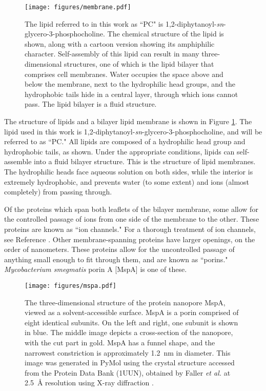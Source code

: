 \begin{figure}[h]
\begin{centering}
\texttt{[image: figures/membrane.pdf]}
\caption[Lipids and the lipid bilayer membrane]{The lipid referred to in this work as ``PC" is 1,2-diphytanoyl-\textit{sn}-glycero-3-phosphocholine.  The chemical structure of the lipid is shown, along with a cartoon version showing its amphiphilic character.  Self-assembly of this lipid can result in many three-dimensional structures, one of which is the lipid bilayer that comprises cell membranes.  Water occupies the space above and below the membrane, next to the hydrophilic head groups, and the hydrophobic tails hide in a central layer, through which ions cannot pass.  The lipid bilayer is a fluid structure.}
\label{fig:lipids}
\end{centering}
\end{figure}

The structure of lipids and a bilayer lipid membrane is shown in Figure \ref{fig:lipids}.  The lipid used in this work is 1,2-diphytanoyl-\textit{sn}-glycero-3-phosphocholine, and will be referred to as ``PC."  All lipids are composed of a hydrophilic head group and hydrophobic tails, as shown.  Under the appropriate conditions, lipids can self-assemble into a fluid bilayer structure.  This is the structure of lipid membranes.  The hydrophilic heads face aqueous solution on both sides, while the interior is extremely hydrophobic, and prevents water (to some extent) and ions (almost completely) from passing through.

Of the proteins which span both leaflets of the bilayer membrane, some allow for the controlled passage of ions from one side of the membrane to the other.  These proteins are known as ``ion channels."  For a thorough treatment of ion channels, see Reference .  Other membrane-spanning proteins have larger openings, on the order of nanometers.  These proteins allow for the uncontrolled passage of anything small enough to fit through them, and are known as ``porins."  \textit{Mycobacterium smegmatis} porin A [MspA] is one of these.

\begin{figure}[h]
\begin{centering}
\texttt{[image: figures/mspa.pdf]}
\caption[The protein nanopore MspA]{The three-dimensional structure of the protein nanopore MspA, viewed as a solvent-accessible surface.  MspA is a porin comprised of eight identical subunits.  On the left and right, one subunit is shown in blue.  The middle image depicts a cross-section of the nanopore, with the cut part in gold.  MspA has a funnel shape, and the narrowest constriction is approximately \SI{1.2}{\nm} in diameter.  This image was generated in PyMol using the crystal structure accessed from the Protein Data Bank (1UUN), obtained by Faller \textit{et al.} at \SI{2.5}{\angstrom} resolution using X-ray diffraction \citep{Faller2004}.}
\label{fig:mspa}
\end{centering}
\end{figure}

